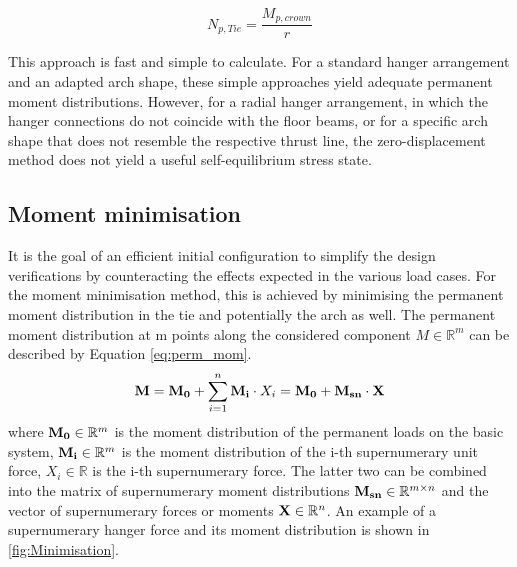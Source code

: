 \begin{equation}
    N_{p,Tie} = \frac{M_{p,crown}}{r}
    \label{eq:M_0}
\end{equation}

This approach is fast and simple to calculate. For a standard hanger arrangement and an adapted arch shape, these simple approaches yield adequate permanent moment distributions. However, for a radial hanger arrangement, in which the hanger connections do not coincide with the floor beams, or for a specific arch shape that does not resemble the respective thrust line, the zero-displacement method does not yield a useful self-equilibrium stress state.

\subsection{Moment minimisation}
It is the goal of an efficient initial configuration to simplify the design verifications by counteracting the effects expected in the various load cases. For the moment minimisation method, this is achieved by minimising the permanent moment distribution in the tie and potentially the arch as well. The permanent moment distribution at m points along the considered component $M \in \mathbb{R}^m$ can be described by Equation \eqref{eq:perm_mom}. 
\begin{equation}
    {\bf M} = {\bf M_0} + \sum_{i=1}^{n} {\bf M_i} \cdot X_i = {\bf M_0} + {\bf M_{sn}} \cdot {\bf X}
    \label{eq:perm_mom}
\end{equation}
where ${\bf M_0} \in \mathbb{R}^m$ is the moment distribution of the permanent loads on the basic system, ${\bf M_i} \in \mathbb{R}^m$ is the moment distribution of the i-th supernumerary unit force, ${X_i} \in \mathbb{R}$ is the i-th supernumerary force. The latter two can be combined into the matrix of supernumerary moment distributions ${\bf M_{sn}} \in  \mathbb{R}^{m\times n}$ and the vector of supernumerary forces or moments ${\bf X} \in \mathbb{R}^n$. An example of a supernumerary hanger force and its moment distribution is shown in \cref{fig:Minimisation}.

